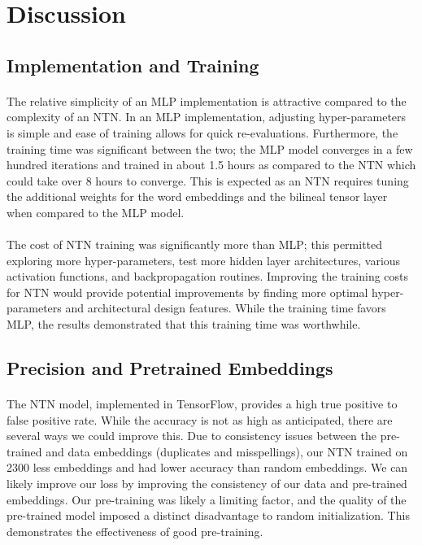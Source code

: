 \documentclass[11.5pt]{article}
\begin{document}
\section{Discussion}

\subsection{Implementation and Training}
\paragraph{} The relative simplicity of an MLP implementation is attractive compared to the complexity of an NTN. In an MLP implementation, adjusting hyper-parameters is simple and ease of training allows for quick re-evaluations. Furthermore, the training time was significant between the two; the MLP model converges in a few hundred iterations and trained in about 1.5 hours as compared to the NTN which could take over 8 hours to converge. This is expected as an NTN requires tuning the additional weights for the word embeddings and the bilineal tensor layer when compared to the MLP model.

\paragraph{}The cost of NTN training was significantly more than MLP; this permitted exploring more hyper-parameters, test more hidden layer architectures, various activation functions, and backpropagation routines. Improving the training costs for NTN would provide potential improvements by finding more optimal hyper-parameters and architectural design features. While the training time favors MLP, the results demonstrated that this training time was worthwhile.

\subsection{Precision and Pretrained Embeddings}
\paragraph{} The NTN model, implemented in  TensorFlow, provides a high true positive to false positive rate. While the accuracy is not as high as anticipated, there are several ways we could improve this. Due to consistency issues between the pre-trained and data embeddings (duplicates and misspellings), our NTN trained on 2300 less embeddings and had lower accuracy than random embeddings. We can likely improve our loss by improving the consistency of our data and pre-trained embeddings. Our pre-training was likely a limiting factor, and the quality of the pre-trained model imposed a distinct disadvantage to random initialization. This demonstrates the effectiveness of good pre-training.
\end{document}
